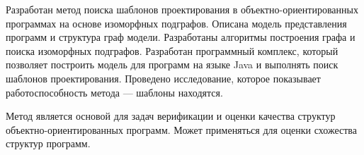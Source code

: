 \Conclusion

Разработан метод поиска шаблонов проектирования в объектно-ориентированных
программах на основе изоморфных подграфов.
Описана модель представления программ и структура граф модели.
Разработаны алгоритмы построения графа и поиска изоморфных подграфов.
Разработан программный комплекс, который позволяет построить модель для
программ на языке Java и выполнять поиск шаблонов проектирования.
Проведено исследование, которое показывает работоспособность метода ---
шаблоны находятся.

Метод является основой для задач верификации и оценки качества
структур объектно-ориентированных программ.
Может применяться для оценки схожества структур программ.
